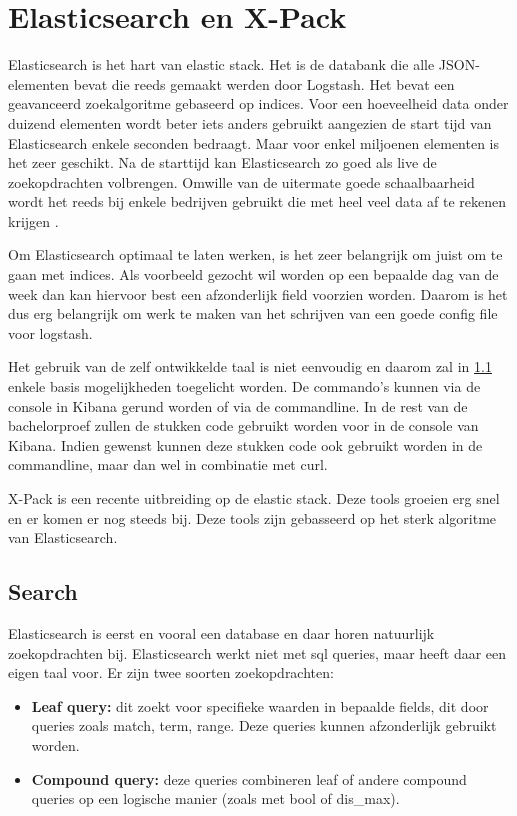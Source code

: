 
\chapter{Elasticsearch en X-Pack}
\label{ch:elasticsearch-xpack}


Elasticsearch is het hart van elastic stack. Het is de databank die alle JSON-elementen bevat die reeds gemaakt werden door Logstash. 
Het bevat een geavanceerd zoekalgoritme gebaseerd op indices. Voor een hoeveelheid data onder duizend elementen wordt beter iets anders gebruikt aangezien de start tijd van Elasticsearch enkele seconden bedraagt.
Maar voor enkel miljoenen elementen is het zeer geschikt. Na de starttijd kan Elasticsearch zo goed als live de zoekopdrachten volbrengen. 
Omwille van de uitermate goede schaalbaarheid wordt het reeds bij enkele bedrijven gebruikt die met heel veel data af te rekenen krijgen \autocite{15companies}.

Om Elasticsearch optimaal te laten werken, is het zeer belangrijk om juist om te gaan met indices. Als voorbeeld gezocht wil worden op een bepaalde dag van de week dan kan hiervoor best een afzonderlijk field voorzien worden. 
Daarom is het dus erg belangrijk om werk te maken van het schrijven van een goede config file voor logstash.

Het gebruik van de zelf ontwikkelde taal is niet eenvoudig en daarom zal in \ref{sec:search} enkele basis mogelijkheden toegelicht worden.
De commando's kunnen via de console in Kibana gerund worden of via de commandline. In de rest van de bachelorproef zullen de stukken code gebruikt worden voor in de console van Kibana.
Indien gewenst kunnen deze stukken code ook gebruikt worden in de commandline, maar dan wel in combinatie met curl.

X-Pack is een recente uitbreiding op de elastic stack. Deze tools groeien erg snel en er komen er nog steeds bij. 
Deze tools zijn gebasseerd op het sterk algoritme van Elasticsearch. 

\section{Search}
\label{sec:search}

Elasticsearch is eerst en vooral een database en daar horen natuurlijk zoekopdrachten bij. Elasticsearch werkt niet met sql queries, maar heeft daar een eigen taal voor. Er zijn twee soorten zoekopdrachten:
\begin{itemize}
	\item \textbf{Leaf query: } dit zoekt voor specifieke waarden in bepaalde fields, dit door queries zoals match, term, range. Deze queries kunnen afzonderlijk gebruikt worden.

	\item \textbf{Compound query: } deze queries combineren leaf of andere compound queries op een logische manier (zoals met bool of dis\_max).
\end{itemize}

